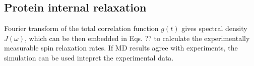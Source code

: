 \documentclass[pre,aps,floatfix,authordate1-4,twocolumn]{revtex4-1}
\begin{document}







\subsection{Protein internal relaxation}

Fourier transform of the total correlation function $g(t)$ gives
spectral density $J(\omega)$, which can be then embedded in Eqs. ??
to calculate the experimentally measurable spin relaxation rates.
If MD results agree with experiments, the simulation can be used
intepret the experimental data.
\end{document}
